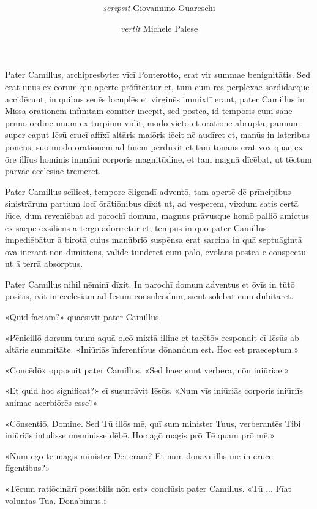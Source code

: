 \documentclass[a4paper, 12pt]{article}
\title{
	\MyTitle
}
\author{\textit{scrīpsit} Giovannino Guareschi \and \textit{vertit} Michele Palese}
\date{}
\begin{document}
	
	\maketitle
	
	Pater Camillus, archipresbyter vīcī Ponterotto, erat vir summae benignitātis.
	Sed erat ūnus ex eōrum quī apertē prŏfitentur et, tum cum rēs perplexae sordidaeque accidērunt, in quibus senēs locuplēs et virginēs immixtī erant, pater Camillus in Missā ōrātiōnem infīnītam comiter incēpit, sed posteā, id temporis cum sānē prīmō ōrdine ūnum ex turpium vīdit, modō victō et ōrātiōne abruptā, pannum super caput Iēsū crucī affīxī altāris maiōris iēcit nē audīret et, manūs in lateribus pōnēns, suō modō ōrātiōnem ad fīnem perdūxit et tam tonāns erat vōx quae ex ōre illīus hominis immāni corporis magnitūdine, et tam magnā dīcēbat, ut tēctum parvae ecclēsiae tremeret.
	
	Pater Camillus scīlicet, tempore ēligendī adventō, tam apertē dē prīncipibus sinistrārum partium locī ōrātiōnibus dīxit ut, ad vesperem, vixdum satis certā lūce, dum reveniēbat ad parochī domum, magnus prāvusque homō palliō amictus ex saepe exsiliēns ā tergō adorīrētur et, tempus in quō pater Camillus impediēbātur ā birotā cuius manūbriō suspēnsa erat sarcina in quā septuāgintā ōva inerant nōn dīmittēns, validē tunderet eum pālō, ēvolāns posteā ē cōnspectū ut ā terrā absorptus.
	
	Pater Camillus nihil nēminī dīxit.
	In parochī domum adventus et ōvīs in tūtō positīs, īvit in ecclēsiam ad Iēsum cōnsulendum, sīcut solēbat cum dubitāret.
	
	«Quid faciam?» quaesīvit pater Camillus.
	
	«Pēnicillō dorsum tuum aquā oleō mixtā illine et tacētō» respondit eī Iēsūs ab altāris summitāte.
	«Iniūriās īnferentibus dōnandum est. Hoc est praeceptum.»
	
	«Concēdō» opposuit pater Camillus.
	«Sed haec sunt verbera, nōn iniūriae.»
	
	«Et quid hoc significat?» eī susurrāvit Iēsūs.
	«Num vīs iniūriās corporis iniūriīs animae acerbiōrēs esse?»
	
	«Cōnsentiō, Domine.
	Sed Tū illōs mē, quī sum minister Tuus, verberantēs Tibi iniūriās intulisse meminisse dēbē.
	Hoc agō magis prō Tē quam prō mē.»
	
	«Num ego tē magis minister Deī eram?
	Et num dōnāvī illīs mē in cruce fīgentibus?»
	
	«Tēcum ratiōcinārī possibilis nōn est» conclūsit pater Camillus.
	«Tū ...
	Fīat voluntās Tua.
	Dōnābimus.»
	
\end{document}
